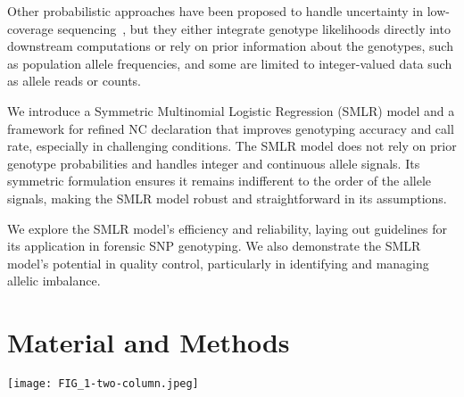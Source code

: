 \documentclass[preprint,5p,times,11pt]{elsarticle}
\begin{document}
Other probabilistic approaches have been proposed to handle uncertainty in low-coverage sequencing~\cite{mostad}, but they either integrate genotype likelihoods directly into downstream computations or rely on prior information about the genotypes, such as population allele frequencies, and some are limited to integer-valued data such as allele reads or counts.

We introduce a Symmetric Multinomial Logistic Regression (SMLR) model and a framework for refined NC declaration that improves genotyping accuracy and call rate, especially in challenging conditions.
The SMLR model does not rely on prior genotype probabilities and handles integer and continuous allele signals.
Its symmetric formulation ensures it remains indifferent to the order of the allele signals, making the SMLR model robust and straightforward in its assumptions.

We explore the SMLR model's efficiency and reliability, laying out guidelines for its application in forensic SNP genotyping.
We also demonstrate the SMLR model's potential in quality control, particularly in identifying and managing allelic imbalance.



\section{Material and Methods}
\begin{figure*}
\centering
\texttt{[image: FIG\_1-two-column.jpeg]}
\caption{
Genotype predictions for the examinations of \SI{31.25}{\pg} DNA.\\
Each plot displays 1,931~SNP observations classified using the genotyping methods:
HID SNP Genotyper Plugin~(HSG), Enforcing the Quality Checks~(EQC), and Symmetric Multinomial Logistic Regression~(SMLR).
A dot represents a set of read counts $(s_1, s_2)$ for an SNP.
It is coloured by the true genotype: red for heterozygous and blue or yellow for homozygous.
Failed genotype predictions are indicated by red crosses for wrong calls and black pluses for no-calls.
In the EQC plot~(middle), the grey areas show where the HSG is guaranteed to flag for allelic imbalance.
In the SMLR plot (right), the solid lines show the decision boundaries of the SMLR model with an intercept fitted to square-root transformed allele signals. The grey area marks the no-call zone where genotype probabilities fall short of the threshold $q = 0.9937$ (a value chosen for illustrative purpose).
Outside the grey area, the predicted genotype has $P(G \mid s_1, s_2) \geq q$.
}
\label{fig:methods}
\end{figure*}
\end{document}
